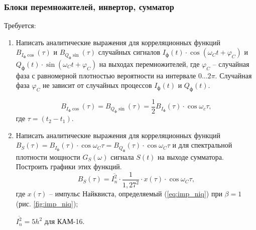 \documentclass[a4paper, 12pt]{article}
\begin{document}
\subsubsection{Блоки перемножителей, инвертор, сумматор}
Требуется:
\begin{enumerate}
  \item Написать аналитические выражения для корреляционных функций
  $B_{I_ф\cos}(\tau)$ и $B_{Q_ф\sin}(\tau)$ случайных сигналов
  $I_ф(t)\cdot\cos(\omega_Ct+\varphi_C)$ и 
  $Q_ф(t)\cdot\sin(\omega_Ct+\varphi_C)$ на выходах перемножителей,
  где $\varphi_C$ -- случайная фаза с равномерной плотностью 
  вероятности на интервале $0...2\pi$. 
  Случайная фаза $\varphi_C$ не зависит от случайных процессов 
  $I_ф(t)$ и $Q_ф(t)$.

  \begin{equation}
    B_{I_ф\cos}(\tau)=B_{Q_ф\sin}(\tau)=\frac 12B_{I_ф}(\tau)\cdot\cos\omega_c\tau,
  \end{equation}
  где $\tau=(t_2-t_1)$.

  \item Написать аналитические выражения для корреляционных 
  функций $B_S(\tau)=B_{I_ф}(\tau)\cdot\cos\omega_C\tau
  =B_{Q_ф}(\tau)\cdot\cos\omega_C\tau$ и для спектральной
  плотности мощности $G_S(\omega)$ сигнала $S(t)$ на
  выходе сумматора. Построить графики этих функций.
  \begin{equation} \label{eq:BSTau}
    B_S(\tau)=\overline{I^2_n}\cdot\frac{1}{1,27^2}\cdot x(\tau)
    \cdot\cos\omega_C\tau,
  \end{equation}
  где $x(\tau)$ -- импульс Найквиста, определяемый 
  (\ref{eq:imp_niq}) при $\beta=1$ (рис. \ref{fig:imp_niq});

  $\overline{I^2_n}=5h^2$ для КАМ-16.
  

\end{enumerate}
\end{document}
